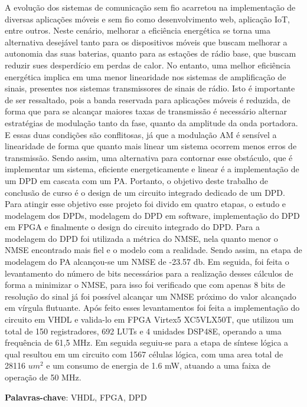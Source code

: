 A evolução dos sistemas de comunicação sem fio acarretou na implementação de diversas aplicações móveis e sem fio como desenvolvimento web, aplicação IoT, entre outros. Neste cenário, melhorar a eficiência energética se torna uma alternativa desejável tanto para os dispositivos móveis que buscam melhorar a autonomia das suas baterias, quanto para as estações de rádio base, que buscam reduzir sues desperdício em perdas de calor. No entanto, uma melhor eficiência energética implica em uma menor linearidade nos sistemas de amplificação de sinais, presentes nos sistemas transmissores de sinais de rádio. Isto é importante de ser ressaltado, pois a banda reservada para aplicações móveis é reduzida, de forma que para se alcançar maiores taxas de transmissão é necessário alternar estratégias de modulação tanto da fase, quanto da amplitude da onda portadora. E essas duas condições são conflitosas, já que a modulação AM é sensível a linearidade de forma que quanto mais linear um sistema ocorrem menos erros de transmissão. Sendo assim, uma alternativa para contornar esse obstáculo, que é implementar um sistema, eficiente energeticamente e linear é a implementação de um DPD em cascata com um PA. Portanto, o objetivo deste trabalho de conclusão de curso é o design de um circuito integrado dedicado de um DPD. Para atingir esse objetivo esse projeto foi divido em quatro etapas, o estudo e modelagem dos DPDs, modelagem do DPD em software, implementação do DPD em FPGA e finalmente o design do circuito integrado do DPD. Para a modelagem do DPD foi utilizada a métrica do NMSE, nela quanto menor o NMSE encontrado mais fiel e o modelo com a realidade. Sendo assim, na etapa de modelagem do PA alcançou-se um NMSE de -23.57 db. Em seguida, foi feita o levantamento do número de bits necessários para a realização desses cálculos de forma a minimizar o NMSE, para isso foi verificado que com apenas 8 bits de resolução do sinal já foi possível alcançar um NMSE próximo do valor alcançado em vírgula flutuante. Após feito esses levantamentos foi feita a implementação do circuito em VHDL e valida-lo em FPGA Virtex5 XC5VLX50T, que utilizou um total de 150 registradores, 692 LUTs e 4 unidades DSP48E, operando a uma frequência de 61,5 MHz. Em seguida seguiu-se para a etapa de síntese lógica a qual resultou em um circuito com 1567 células lógica, com uma area total de 28116 $um^2$ e um consumo de energia de 1.6 mW, atuando a uma faixa de operação de 50 MHz.

\textbf{Palavras-chave}: VHDL, FPGA, DPD 
